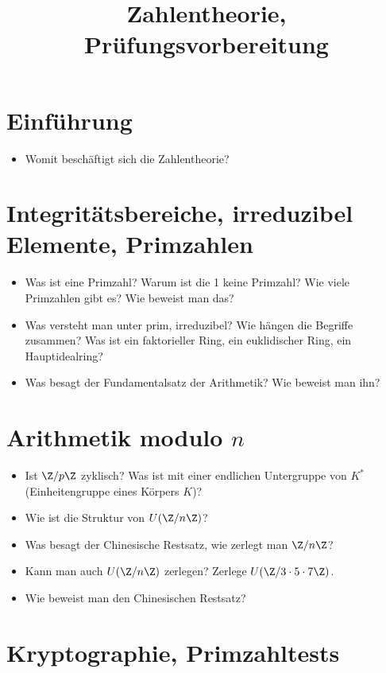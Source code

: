 \documentclass{scrartcl}
\title{Zahlentheorie, Prüfungsvorbereitung}
\author{}
\date{}
\begin{document}
\maketitle

\setcounter{section}{-1}
\section{Einführung}

\begin{itemize}
	\item
		Womit beschäftigt sich die Zahlentheorie?
\end{itemize}

\section{Integritätsbereiche, irreduzibel Elemente, Primzahlen}

\begin{itemize}
	\item
		Was ist eine Primzahl?
		Warum ist die 1 keine Primzahl?
		Wie viele Primzahlen gibt es?
		Wie beweist man das?
	\item
		Was versteht man unter prim, irreduzibel?
		Wie hängen die Begriffe zusammen?
		Was ist ein faktorieller Ring, ein euklidischer Ring, ein Hauptidealring?
	\item
		Was besagt der Fundamentalsatz der Arithmetik?
		Wie beweist man ihn?
\end{itemize}

\section{Arithmetik modulo $n$}

\begin{itemize}
	\item
		Ist $\Z/p\Z$ zyklisch?
		Was ist mit einer endlichen Untergruppe von $K^*$ (Einheitengruppe eines Körpers $K$)?
	\item
		Wie ist die Struktur von $U(\Z/n\Z)$?
	\item
		Was besagt der Chinesische Restsatz, wie zerlegt man $\Z/n\Z$?
	\item
		Kann man auch $U(\Z/n\Z)$ zerlegen?
		Zerlege $U(\Z / 3\cdot 5 \cdot 7 \Z)$.
	\item
		Wie beweist man den Chinesischen Restsatz?
\end{itemize}

\section{Kryptographie, Primzahltests}
\end{document}
